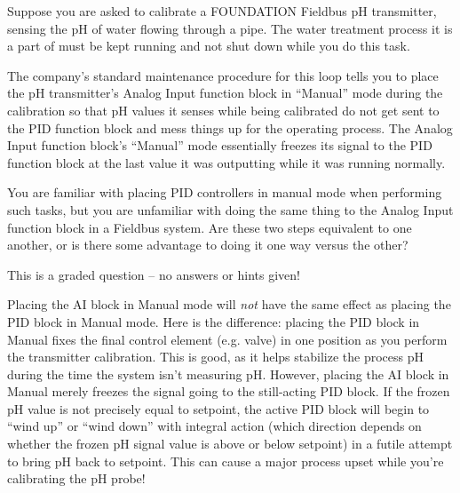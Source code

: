 

Suppose you are asked to calibrate a FOUNDATION Fieldbus pH transmitter, sensing the pH of water flowing through a pipe.  The water treatment process it is a part of must be kept running and not shut down while you do this task.  

The company's standard maintenance procedure for this loop tells you to place the pH transmitter's Analog Input function block in ``Manual'' mode during the calibration so that pH values it senses while being calibrated do not get sent to the PID function block and mess things up for the operating process.  The Analog Input function block's ``Manual'' mode essentially freezes its signal to the PID function block at the last value it was outputting while it was running normally.

\vskip 10pt

You are familiar with placing PID controllers in manual mode when performing such tasks, but you are unfamiliar with doing the same thing to the Analog Input function block in a Fieldbus system.  Are these two steps equivalent to one another, or is there some advantage to doing it one way versus the other?

\vfil

\eject






This is a graded question -- no answers or hints given!







Placing the AI block in Manual mode will {\it not} have the same effect as placing the PID block in Manual mode.  Here is the difference: placing the PID block in Manual fixes the final control element (e.g. valve) in one position as you perform the transmitter calibration.  This is good, as it helps stabilize the process pH during the time the system isn't measuring pH.  However, placing the AI block in Manual merely freezes the signal going to the still-acting PID block.  If the frozen pH value is not precisely equal to setpoint, the active PID block will begin to ``wind up'' or ``wind down'' with integral action (which direction depends on whether the frozen pH signal value is above or below setpoint) in a futile attempt to bring pH back to setpoint.  This can cause a major process upset while you're calibrating the pH probe!

